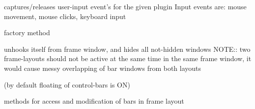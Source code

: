 captures/releases user-input event's for the given plugin
Input events are: mouse movement, mouse clicks, keyboard input


\label{wxframelayoutcreatecursors}



\label{wxframelayoutcreateupdatesmanager}


factory method


\label{wxframelayoutdeactivate}


unhooks itself from frame window, and hides all not-hidden windows
NOTE:: two frame-layouts should not be active at the same time in the
same frame window, it would cause messy overlapping of bar windows
from both layouts


\label{wxframelayoutdestroybarwindows}



\label{wxframelayoutdosetbarstate}



\label{wxframelayoutenablefloating}


(by default floating of control-bars is ON)


\label{wxframelayoutfindbarbyname}


methods for access and modification of bars in frame layout


\label{wxframelayoutfindbarbywindow}



\label{wxframelayoutfindplugin}


